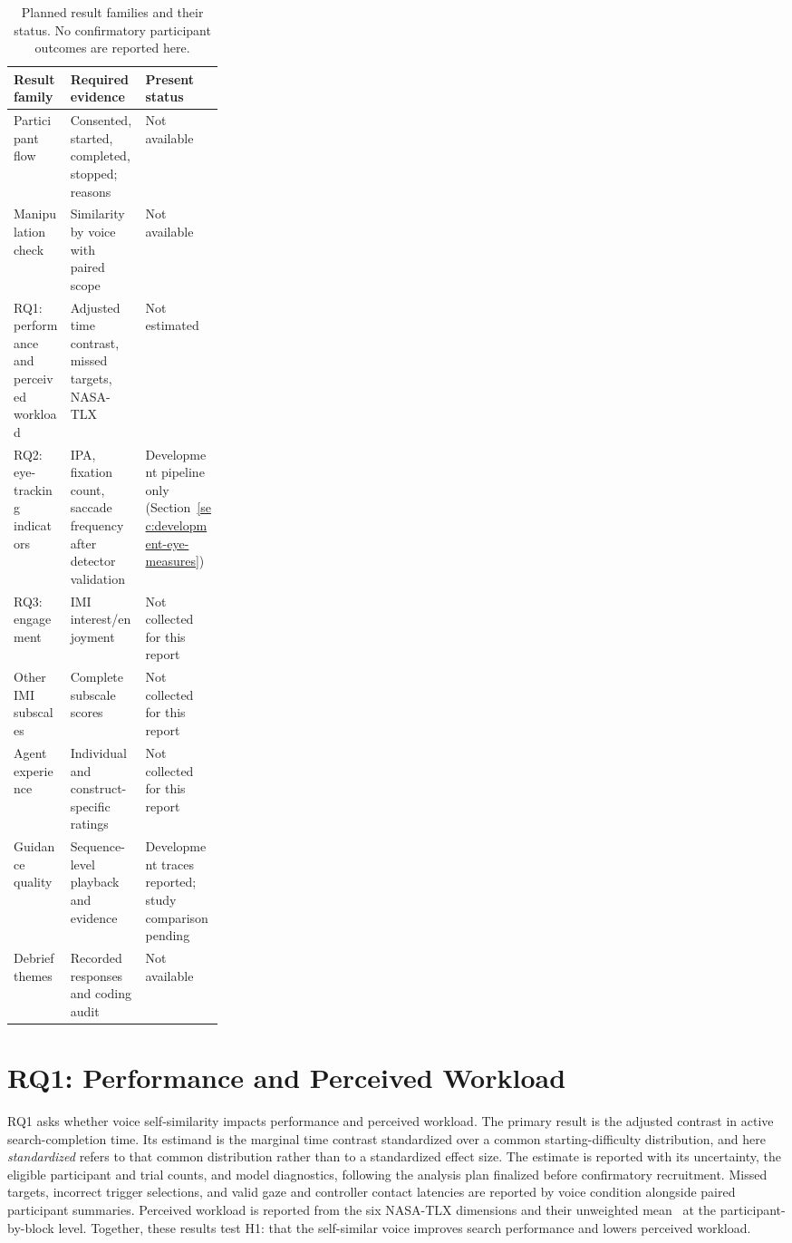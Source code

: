 \begin{table}[htbp]
\centering\caption{Planned result families and their status. No confirmatory participant outcomes are reported here.}
\small{}
\begin{tabularx}{\linewidth}{@{}p{0.27\linewidth}XX@{}}\toprule
Result family & Required evidence & Present status \\\midrule
Participant flow & Consented, started, completed, stopped; reasons & Not available \\
Manipulation check & Similarity by voice with paired scope & Not available \\
RQ1: performance and perceived workload & Adjusted time contrast, missed targets, NASA-TLX & Not estimated \\
RQ2: eye-tracking indicators & IPA, fixation count, saccade frequency after detector validation & Development pipeline only (Section~\ref{sec:development-eye-measures}) \\
RQ3: engagement & IMI interest/enjoyment & Not collected for this report \\
Other IMI subscales & Complete subscale scores & Not collected for this report \\
Agent experience & Individual and construct-specific ratings & Not collected for this report \\
Guidance quality & Sequence-level playback and evidence & Development traces reported; study comparison pending \\
Debrief themes & Recorded responses and coding audit & Not available \\\bottomrule
\end{tabularx}
\end{table}

\section{RQ1: Performance and Perceived Workload}
RQ1 asks whether voice self-similarity impacts performance and perceived workload. The primary result is the adjusted contrast in active search-completion time. Its estimand is the marginal time contrast standardized over a common starting-difficulty distribution, and here \emph{standardized} refers to that common distribution rather than to a standardized effect size. The estimate is reported with its uncertainty, the eligible participant and trial counts, and model diagnostics, following the analysis plan finalized before confirmatory recruitment. Missed targets, incorrect trigger selections, and valid gaze and controller contact latencies are reported by voice condition alongside paired participant summaries. Perceived workload is reported from the six NASA-TLX dimensions and their unweighted mean~\cite{hart1988nasatlx} at the participant-by-block level. Together, these results test H1: that the self-similar voice improves search performance and lowers perceived workload.

